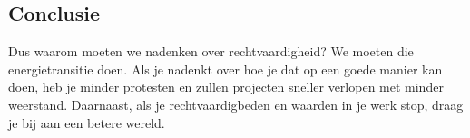 \documentclass[../summary.tex]{subfiles}
\begin{document}
	\subsection{Conclusie}
	
	Dus waarom moeten we nadenken over rechtvaardigheid? We moeten die energietransitie doen. Als je nadenkt over hoe je dat op een goede manier kan doen, heb je minder protesten en zullen projecten sneller verlopen met minder weerstand. Daarnaast, als je rechtvaardigbeden en waarden in je werk stop, draag je bij aan een betere wereld. 
	
\end{document}
